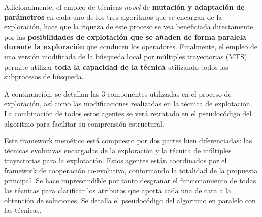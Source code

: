 Adicionalmente, el empleo de técnicas \textit{novel} de \textbf{mutación y adaptación de parámetros} en cada uno de los tres algoritmos que se encargan de la exploración, hace que la riqueza de este proceso se vea beneficiada directamente por las \textbf{posibilidades de explotación que se añaden de forma paralela durante la exploración} que conducen los operadores. Finalmente, el empleo de una versión modificada de la búsqueda local por múltiples trayectorias (MTS) permite utilizar \textbf{toda la capacidad de la técnica} utilizando todos los subprocesos de búsqueda.

A continuación, se detallan las 3 componentes utilizadas en el proceso de exploración, así como las modificaciones realizadas en la técnica de explotación. La combinación de todos estos agentes se verá retratado en el pseudocódigo del algoritmo para facilitar su comprensión estructural.

Este framework memético está compuesto por dos partes bien diferenciadas: las técnicas evolutivas encargadas de la exploración y la técnica de múltiples trayectorias para la explotación. Estos agentes están coordinados por el framework de cooperación co-evolutiva, conformando la totalidad de la propuesta principal. Se hace imprescindible por tanto desgranar el funcionamiento de todas las técnicas para clarificar los atributos que aporta cada una de cara a la obtención de soluciones. Se detalla el pseudocódigo del algoritmo en paralelo con las técnicas.

